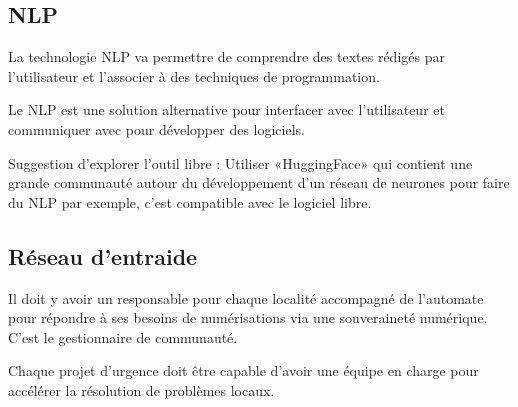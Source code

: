 
\subsection{NLP}
La technologie NLP va permettre de comprendre des textes rédigés par l’utilisateur et l’associer à des techniques de programmation.



Le NLP est une solution alternative pour interfacer avec l’utilisateur et communiquer avec pour développer des logiciels.

Suggestion d’explorer l’outil libre : Utiliser «HuggingFace» qui contient une grande communauté autour du développement d’un réseau de neurones pour faire du NLP par exemple, c’est compatible avec le logiciel libre.



\subsection{Réseau d’entraide}

Il doit y avoir un responsable pour chaque localité accompagné de l’automate pour répondre à ses besoins de numérisations via une souveraineté numérique. C’est le gestionnaire de communauté.

Chaque projet d’urgence doit être capable d’avoir une équipe en charge pour accélérer la résolution de problèmes locaux.

